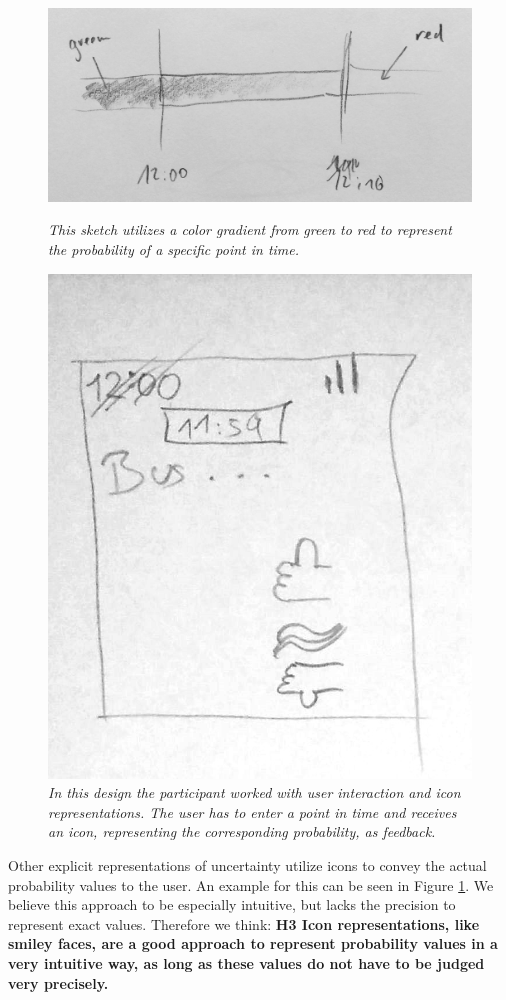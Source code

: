 \begin{figure}[H]
	\begin{minipage}{.45\textwidth}
		\centering
		\captionsetup{width=0.8\textwidth}
		\includegraphics[height=0.5\textwidth]{figures/gradientSketch.jpg}
		\caption{\textit{This sketch utilizes a color gradient from green to red to represent the probability of a specific point in time.}}
		\label{fig:gradSketch}
	\end{minipage}
	\begin{minipage}{.55\textwidth}
		\centering
		\captionsetup{width=1.0\textwidth}
		\includegraphics[height=0.55\textwidth]{figures/iconSketch.jpg}
		\caption{\textit{In this design the participant worked with user interaction and icon representations. The user has to enter a point in time and receives an icon, representing the corresponding probability, as feedback.}}
		\label{fig:iconSketch}
	\end{minipage}
\end{figure}

Other explicit representations of uncertainty utilize icons to convey the actual probability values to the user. An example for this can be seen in Figure \ref{fig:iconSketch}. We believe this approach to be especially intuitive, but lacks the precision to represent exact values. Therefore we think: \textbf{H3 Icon representations, like smiley faces, are a good approach to represent probability values in a very intuitive way, as long as these values do not have to be judged very precisely.}\par \medskip

